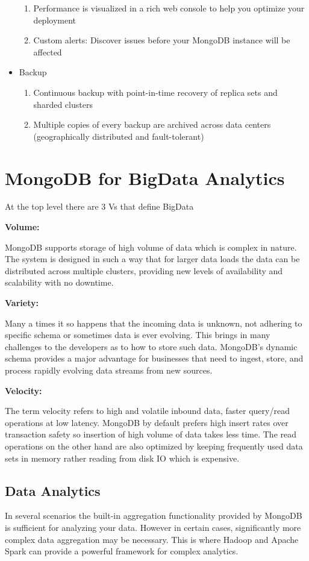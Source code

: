 \documentclass[9pt,twocolumn,twoside]{styles/osajnl}
\begin{document}
\begin{itemize}
\begin{enumerate}
    \item Performance is visualized in a rich web console to help you optimize your deployment
    \item Custom alerts: Discover issues before your MongoDB instance will be affected
\end{enumerate}
\item Backup
\begin {enumerate}
    \item Continuous backup with point-in-time recovery of replica sets and sharded clusters
    \item Multiple copies of every backup are archived across data centers (geographically distributed and fault-tolerant)
\end{enumerate}
\end{itemize}

\section{MongoDB for BigData Analytics}

At the top level there are 3 Vs that define BigData \cite{www-mongo1}

{\bfseries Volume:}

MongoDB supports storage of high volume of data which is complex in nature. The system is designed in such a way that for larger data loads the data can be distributed across multiple clusters, providing new levels of availability and scalability with no downtime.

{\bfseries Variety:}

Many a times it so happens that the incoming data is unknown, not adhering to specific schema or sometimes data is ever evolving. This brings in many challenges to the developers as to how to store such data. MongoDB’s dynamic schema provides a major advantage for businesses that need to ingest, store, and process rapidly evolving data streams from new sources.

{\bfseries Velocity:}

The term velocity refers to high and volatile inbound data, faster query/read operations at low latency. MongoDB by default prefers high insert rates over transaction safety so insertion of high volume of data takes less time. The read operations on the other hand are also optimized by keeping frequently used data sets in memory rather reading from disk IO which is expensive.

\subsection{Data Analytics}
\cite{www-mongo7} In several scenarios the built-in aggregation functionality provided by MongoDB is sufficient for analyzing your data. However in certain cases, significantly more complex data aggregation may be necessary. This is where Hadoop and Apache Spark can provide a powerful framework for complex analytics.
\end{document}
